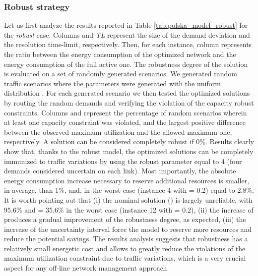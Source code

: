 \documentclass[final,5p,times,twocolumn]{elsarticle}
\begin{document}
\subsubsection{Robust strategy}
Let us first analyze the results reported in Table \ref{tab:polska_model_robust} for the \textit{robust} case. Columns  and \textit{TL}  represent the size of the demand deviation and the resolution time-limit, respectively. Then, for each instance, column  represents the ratio between the energy consumption of the optimized network and the energy consumption of the full active one.
The robustness degree of the solution is evaluated on a set of randomly generated scenarios. We generated  random traffic scenarios where the  parameters were generated with the uniform distribution . For each generated scenario we then tested the optimized solutions by routing the random demands and verifying the violation of the capacity robust constraints. Columns  and  represent the percentage of random scenarios wherein at least one capacity constraint was violated, and the largest positive difference between the observed maximum utilization and the allowed maximum one, respectively. A solution can be considered completely robust if   0\%. Results clearly show that, thanks to the robust model, the optimized solutions can be completely immunized to traffic variations by using the robust parameter  equal to 4 (four demands considered uncertain on each link). Most importantly, the absolute  energy consumption increase necessary to reserve additional resources is smaller, in average, than 1\%, and, in the worst case (instance 4 with  = 0.2) equal to 2.8\%. It is worth pointing out that (i) the nominal solution () is largely unreliable, with  95.6\% and  = 35.6\% in the worst case (instance 12 with  = 0.2), (ii) the increase of  produces a gradual improvement of the robustness degree, as expected, (iii) the increase of the uncertainty interval force the model to reserve more resources and reduce the potential savings. The results analysis suggests that robustness has a relatively small energetic cost and allows to greatly reduce the violations of the maximum utilization constraint due to traffic variations, which is a very crucial aspect for any off-line network management approach.
\end{document}

